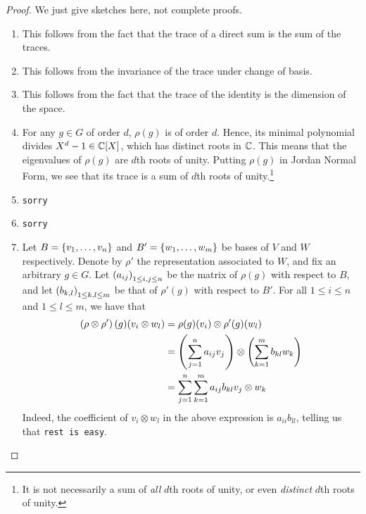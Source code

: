 \begin{proof}
    We just give sketches here, not complete proofs.
    \begin{enumerate}[noitemsep]
        \item This follows from the fact that the trace of a direct sum is the sum of the traces.
        \item This follows from the invariance of the trace under change of basis.
        \item This follows from the fact that the trace of the identity is the dimension of the space.
        \item For any $g \in G$ of order $d$, $\rho(g)$ is of order $d$. Hence, its minimal polynomial divides $X^d - 1 \in \mathbb{C}[X]$, which has distinct roots in $\mathbb{C}$. This means that the eigenvalues of $\rho(g)$ are $d$th roots of unity. Putting $\rho(g)$ in Jordan Normal Form, we see that its trace is a sum of $d$th roots of unity.\footnote{It is not necessarily a sum of \textit{all} $d$th roots of unity, or even \textit{distinct} $d$th roots of unity.}
        \item \verb|sorry|
        \item \verb|sorry|
        \item Let $B = \left\{ v_1, \ldots, v_n \right\}$ and $B' = \left\{ w_1, \ldots, w_m \right\}$ be bases of $V$ and $W$ respectively. Denote by $\rho'$ the representation associated to $W$, and fix an arbitrary $g \in G$. Let $\left( a_{ij} \right)_{1 \leq i, j \leq n}$ be the matrix of $\rho(g)$ with respect to $B$, and let $\left( b_{k, l} \right)_{1 \leq k, l \leq m}$ be that of $\rho'(g)$ with respect to $B'$. %
        For all $1 \leq i \leq n$ and $1 \leq l \leq m$, we have that
        \begin{align*}
            \left( \rho \otimes \rho' \right)(g)(v_i \otimes w_l) &= \rho(g)(v_i) \otimes \rho'(g)(w_l) \\
            &= \left( \sum_{j=1}^{n} a_{ij} v_j \right) \otimes \left( \sum_{k=1}^{m} b_{kl} w_k \right) \\
            &= \sum_{j=1}^{n} \sum_{k=1}^{m} a_{ij} b_{kl} v_j \otimes w_k
        \end{align*}
        Indeed, the coefficient of $v_i \otimes w_l$ in the above expression is $a_{ii}b_{ll}$, telling us that \verb|rest is easy|.
    \end{enumerate}
\end{proof}

